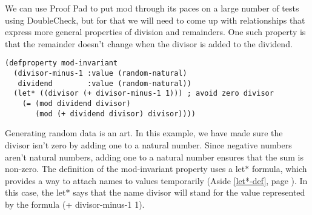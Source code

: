We can use Proof Pad to put \textsf{mod}
through its paces on a large number of tests using DoubleCheck,
but for that we will need to come up with relationships
that express more general properties of division and remainders.
One such property is that the remainder doesn't change
when the divisor is added to the dividend.

\begin{Verbatim}
(defproperty mod-invariant
  (divisor-minus-1 :value (random-natural)
   dividend        :value (random-natural))
  (let* ((divisor (+ divisor-minus-1 1))) ; avoid zero divisor
    (= (mod dividend divisor)
       (mod (+ dividend divisor) divisor))))
\end{Verbatim}

Generating
random data
is an art.
In this example, we have made sure the divisor isn't zero
by adding one to a natural number.
Since negative numbers aren't natural numbers, adding one
to a natural number ensures that the sum is non-zero.
\label{let-example-brief-explain}
The definition of the \textsf{mod-invariant} property
uses a \textsf{let$*$} formula,
which provides a way to attach names to values temporarily
(Aside \ref{let*-def}, page \pageref{let*-def}).
In this case, the \textsf{let$*$} says that
the name \textsf{divisor} will stand for
the value represented by the formula \textsf{(+ divisor-minus-1 1)}.

